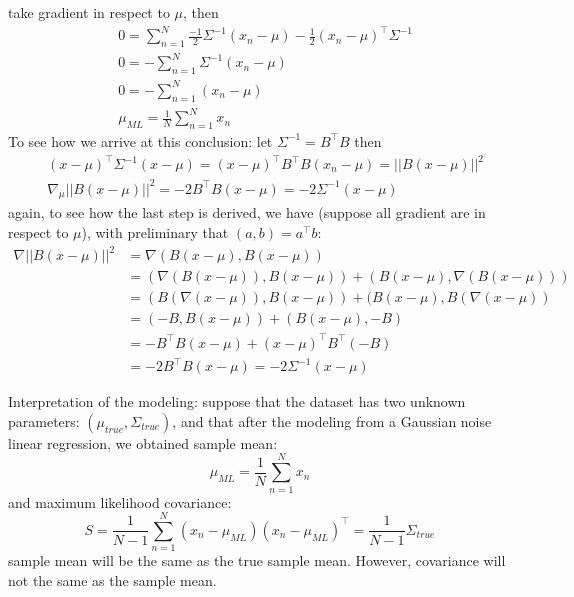 \documentclass[11pt]{article}
\theoremstyle{plain}
\theoremstyle{definition}
\begin{document}
take gradient in respect to $\mu$, then \begin{align*}
& 0 = \sum_{n=1}^{N} \frac{-1}{2} \Sigma^{-1}(x_n -\mu) -\frac{1}{2} (x_n - \mu)^\top \Sigma^{-1} \\
& 0 = -\sum_{n=1}^{N} \Sigma^{-1} (x_n - \mu) \\
& 0 = -\sum_{n=1}^{N} (x_n - \mu) \\
& \mu_{ML} = \frac{1}{N}\sum_{n=1}^{N} x_n 
\end{align*}
To see how we arrive at this conclusion: 
let $\Sigma^{-1} = B^\top B$ then 
\begin{align*}
& (x - \mu)^\top \Sigma^{-1} (x - \mu) = (x - \mu)^\top B^\top B (x_n -\mu) = ||B(x - \mu)||^2\\
& \nabla_\mu ||B(x-\mu)||^2  = -2 B^\top B (x-\mu) = -2\Sigma^{-1}(x-\mu)
\end{align*}
again, to see how the last step is derived, we have (suppose all gradient are in respect to $\mu$), with preliminary that $(a,b) = a^\top b$:\begin{align*}
\nabla ||B(x-\mu)||^2 &= \nabla(B(x-\mu), B(x-\mu))\\
	                  &= (\nabla(B(x-\mu)) , B(x-\mu) ) + (B(x-\mu), \nabla (B(x-\mu))) \\
	                  &= (B(\nabla(x -\mu)), B(x-\mu)) + (B(x-\mu), B(\nabla (x - \mu))\\
	                  &= (-B, B(x-\mu)) + (B(x-\mu), -B) \\
	                  &= -B^\top B(x-\mu) + (x-\mu)^\top B^\top (-B) \\
	                  &= -2B^\top B (x-\mu) = -2\Sigma^{-1}(x-\mu)
\end{align*}

Interpretation of the modeling: suppose that the dataset has two unknown parameters: $(\mu_{true}, \Sigma_{true})$, and that after the modeling from a Gaussian noise linear regression, we obtained sample mean: 
\begin{equation}
\mu_{ML} = \frac{1}{N}\sum\limits_{n=1}^{N} x_n 
\end{equation}
and maximum likelihood covariance: \begin{equation}
 S = \frac{1}{N-1}\sum\limits_{n=1}^{N}(x_n-\mu_{ML})(x_n-\mu_{ML})^\top = \frac{1}{N-1}\Sigma_{true}
\end{equation}
sample mean will be the same as the true sample mean. However, covariance will not the same as the sample mean. 
\end{document}
